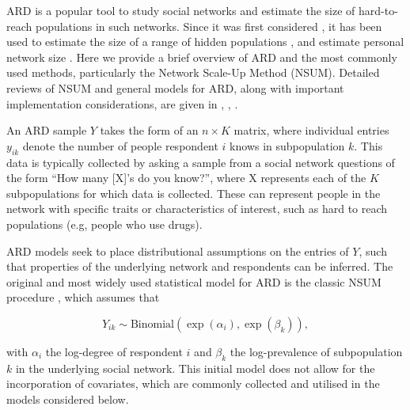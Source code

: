ARD is a popular tool to study social networks and estimate the
size of hard-to-reach populations in such networks.
Since it was first considered \citep{bernard1991estimating}, it has been
used to estimate the size of a range of hidden populations
\citep{bernard2010counting}, \citep{salganik2011assessing} and estimate
personal network size \citep{mccormick2010many}. Here we provide a brief overview
of ARD and the most commonly used methods, particularly the
Network Scale-Up Method (NSUM). Detailed reviews of NSUM and general models
for ARD, along with important
implementation considerations,
are given in \citet{laga2021thirty}, \citet{mccormick2020network}, \citet{ward2025bayesian}.

An ARD sample \(Y\) takes the form of an \(n \times K\) matrix, where
individual entries \(y_{ik}\) denote the number of people respondent \(i\) knows
in subpopulation \(k\). This data is typically collected by asking a sample
from a social network questions of the form ``How many {[}X{]}'s do you know?'',
where X represents each of the \(K\) subpopulations for which data is collected.
These can represent people in the network with specific traits or
characteristics of interest, such as hard to reach populations (e.g, people
who use drugs).

ARD models seek to place distributional assumptions on the
entries of \(Y\), such that properties of the underlying network
and respondents can be inferred.
The original and most widely used statistical model for ARD is the
classic NSUM procedure \citep[\citet{killworth1998social}]{killworth1998estimation},
which assumes that

\begin{equation}
Y_{ik} \sim \text{Binomial}(\exp(\alpha_i), \exp(\beta_k)),
\label{eq:simp-pois}
\end{equation}

with \(\alpha_i\) the log-degree of respondent \(i\) and \(\beta_k\)
the log-prevalence of subpopulation \(k\) in the underlying social network.
This initial model does not allow for the incorporation of covariates,
which are commonly collected and utilised in the models considered below.

